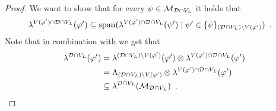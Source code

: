 \documentclass{article}
\newcommand{\set}[1]{\{ #1 \}}
\newcommand{\eqperiod}{\enspace .}
\newcommand{\V}[1][]{V_{#1}}
\newcommand{\Vl}{\V[L]}
\newcommand{\linspace}[1][]{\ensuremath \Lambda_{{#1}}}
\newcommand{\linmapl}[2][]{\ensuremath \lambda^{{#2}}_{{#1}}}
\newcommand{\linmaplof}[3][]{\linmapl[#1]{#2}(#3)}
\newcommand{\diffclosure}[1][]{D_{{#1}}}
\renewcommand{\diffclosure}[1][]{\mathcal{D}_{{#1}}}
\newcommand{\matchb}{\varphi'}
\newcommand{\matchc}{\psi}
\newcommand{\matchd}{\psi'}
\newcommand{\matchings}[1][]{\ensuremath \mathcal{M}_{{#1}}}
\newcommand{\spans}[1]{\mathrm{span} ( #1 )}
\newcommand{\tensor}{\ensuremath \otimes}
\numberwithin{equation}{section}
\begin{document}
\begin{proof}
  We want to show that for every
  $\matchc \in \matchings[\diffclosure \cap \Vl]$ it holds that
  \begin{align}\label{eq:d_def}
    \linmaplof{V(\matchb) \cap \diffclosure \cap \Vl}{\matchb}
    &\subseteq
      \spans{\linmaplof{V(\matchb) \cap \diffclosure \cap \Vl}
      {\matchd} \mid \matchd \in
      \set{\matchc}_{(\diffclosure \cap \Vl) \setminus V(\matchb)}} \eqperiod
  \end{align}
  Note that in combination with  we get that
  \begin{align} \label{eq:d}
    \linmaplof{\diffclosure \cap \Vl}{\matchb}
    &=
      \linmaplof{(\diffclosure \cap \Vl) \setminus V(\matchb)}
      {\matchb} \tensor
      \linmaplof{V(\matchb) \cap \diffclosure \cap \Vl}{\matchb}\\
    &=
      \linspace[(\diffclosure \cap \Vl) \setminus V(\matchb)] \tensor
      \linmaplof{V(\matchb) \cap \diffclosure \cap \Vl}{\matchb}\\
    &\subseteq
      \linmaplof{\diffclosure \cap \Vl}{
      \matchings[\diffclosure \cap \Vl]}
      \eqperiod
  \end{align}


\end{proof}
\end{document}
